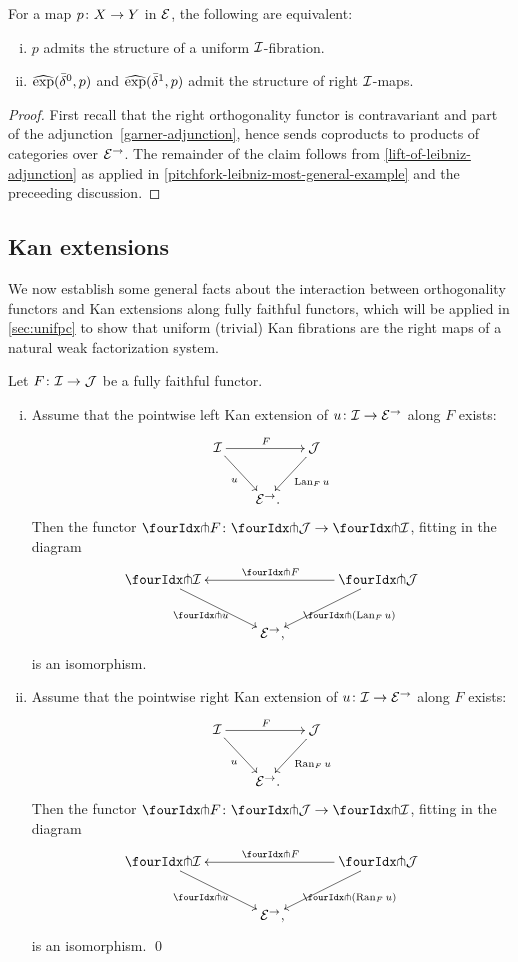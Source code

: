 \documentclass[reqno,10pt,a4paper,oneside,draft]{amsart}
\begin{document}
\begin{proposition} \label{prod-exp-general}
For a map $p \co X \to Y$ in $\catE$, the following are equivalent:
\begin{enumerate}[(i)]
\item $p$ admits the structure of a uniform $\cal{I}$-fibration.
\item $\hatexp(\bar{\delta}^0, p)$ and $\hatexp(\bar{\delta}^1, p)$ admit the structure of right $\cal{I}$-maps.
\end{enumerate}
\end{proposition}

\begin{proof}
First recall that the right orthogonality functor is contravariant and part of the adjunction~\eqref{garner-adjunction}, hence sends coproducts to products of categories over $\catE^\to$.
The remainder of the claim follows from \cref{lift-of-leibniz-adjunction} as applied in \cref{pitchfork-leibniz-most-general-example} and the preceeding discussion.
\end{proof}

\subsection*{Kan extensions}

We now establish some general facts about the interaction between orthogonality functors and Kan extensions along fully faithful functors, which will be applied in \cref{sec:unifpc} to show that uniform (trivial) Kan fibrations are the right maps of a natural weak factorization system.

\begin{proposition} \label{kan-extension-closure}
Let $F \co \cal{I} \to \cal{J}$ be a fully faithful functor.
\begin{enumerate}[(i)]
\item Assume that the pointwise left Kan extension of $u \co \cal{I} \to \catE^\to$ along $F$ exists:
\[
\xymatrix@!C@C-1em{
  \cal{I}
  \ar[dr]_{u}
  \ar[rr]^{F}
&&
  \cal{J}
  \ar[dl]^{\Lan_F u}
\\&
  \catE^\to
\rlap{.}}
\]
Then the functor $\liftr{F} \co \liftr{\cal{J}} \to \liftr{\cal{I}}$, fitting in the diagram
\[
\xymatrix@!C@C-1em{
  \liftr{\cal{I}}
  \ar[dr]_{\liftr{u}}
&&
  \liftr{\cal{J}}
  \ar[ll]_{\liftr{F}}
  \ar[dl]^{\liftr{(\Lan_F u)}}
\\&
  \catE^\to
\rlap{,}}
\]
is an isomorphism.
\item Assume that the pointwise right Kan extension of $u \co \cal{I} \to \catE^\to$ along $F$ exists:
\[
\xymatrix@!C@C-1em{
  \cal{I}
  \ar[dr]_{u}
  \ar[rr]^{F}
&&
  \cal{J}
  \ar[dl]^{\Ran_F u}
\\&
  \catE^\to
\rlap{.}}
\]
Then the functor $\liftl{F} \co \liftl{\cal{J}} \to \liftl{\cal{I}}$, fitting in the diagram
\[
\xymatrix@!C@C-1em{
  \liftl{\cal{I}}
  \ar[dr]_{\liftl{u}}
&&
  \liftl{\cal{J}}
  \ar[ll]_{\liftl{F}}
  \ar[dl]^{\liftl{(\Ran_F u)}}
\\&
  \catE^\to
\rlap{,}}
\]
is an isomorphism.
\qed
\end{enumerate}
\end{proposition}
\end{document}
